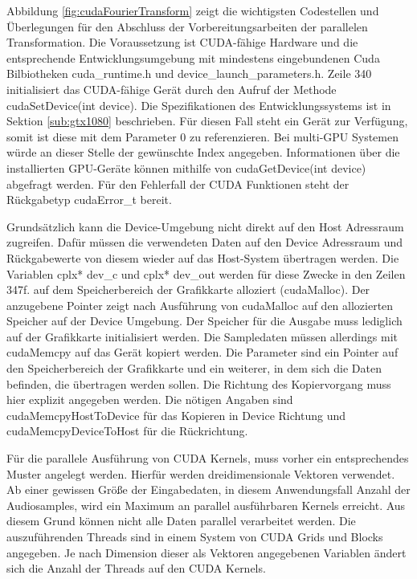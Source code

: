 Abbildung \ref{fig:cudaFourierTransform} zeigt die wichtigsten Codestellen und Überlegungen für den Abschluss der Vorbereitungsarbeiten der parallelen Transformation. Die Voraussetzung ist CUDA-fähige Hardware und die entsprechende Entwicklungsumgebung mit mindestens eingebundenen Cuda Bilbiotheken cuda\_runtime.h und device\_launch\_parameters.h.
Zeile 340 initialisiert das CUDA-fähige Gerät durch den Aufruf der Methode cudaSetDevice(int device). Die Spezifikationen des Entwicklungssystems ist in Sektion \ref{sub:gtx1080} beschrieben. Für diesen Fall steht ein Gerät zur Verfügung, somit ist diese mit dem Parameter 0 zu referenzieren. Bei multi-GPU Systemen würde an dieser Stelle der gewünschte Index angegeben. Informationen über die installierten GPU-Geräte können mithilfe von cudaGetDevice(int device) abgefragt werden. Für den Fehlerfall der CUDA Funktionen steht der Rückgabetyp cudaError\_t bereit. 

Grundsätzlich kann die Device-Umgebung nicht direkt auf den Host Adressraum zugreifen. Dafür müssen die verwendeten Daten auf den Device Adressraum und Rückgabewerte von diesem wieder auf das Host-System übertragen werden. Die Variablen cplx* dev\_c und cplx* dev\_out werden für diese Zwecke in den Zeilen 347f. auf dem Speicherbereich der Grafikkarte alloziert (cudaMalloc). Der anzugebene Pointer zeigt nach Ausführung von cudaMalloc auf den allozierten Speicher auf der Device Umgebung. Der Speicher für die Ausgabe muss lediglich auf der Grafikkarte initialisiert werden. Die Sampledaten müssen allerdings mit cudaMemcpy auf das Gerät kopiert werden. Die Parameter sind ein Pointer auf den Speicherbereich der Grafikkarte und ein weiterer, in dem sich die Daten befinden, die übertragen werden sollen. Die Richtung des Kopiervorgang muss hier explizit angegeben werden. Die nötigen Angaben sind cudaMemcpyHostToDevice für das Kopieren in Device Richtung und cudaMemcpyDeviceToHost für die Rückrichtung.

Für die parallele Ausführung von CUDA Kernels, muss vorher ein entsprechendes Muster angelegt werden. Hierfür werden dreidimensionale Vektoren verwendet. Ab einer gewissen Größe der Eingabedaten, in diesem Anwendungsfall Anzahl der Audiosamples, wird ein Maximum an parallel ausführbaren Kernels erreicht. Aus diesem Grund können nicht alle Daten parallel verarbeitet werden. Die auszuführenden Threads sind in einem System von CUDA Grids und Blocks angegeben. Je nach Dimension dieser als Vektoren angegebenen Variablen ändert sich die Anzahl der Threads auf den CUDA Kernels. 

